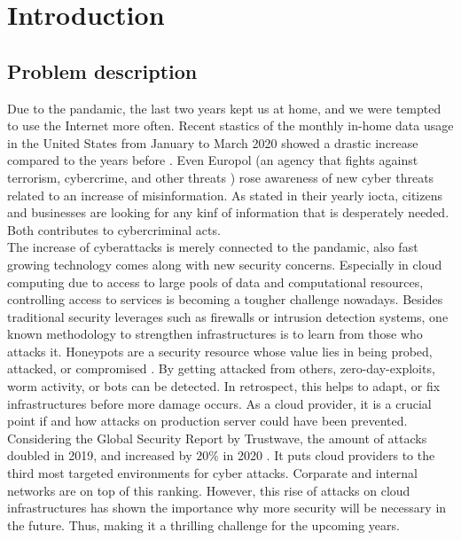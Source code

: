 \chapter{Introduction}


\section{Problem description}

Due to the pandamic, the last two years kept us at home, and we were tempted to use the Internet more often. Recent stastics of the monthly in-home data usage in the United States from January to March 2020 showed a drastic increase compared to the years before \cite{statista2021}. Even Europol (an agency that fights against terrorism, cybercrime, and other threats \cite{europol2021}) rose awareness of new cyber threats related to an increase of misinformation. As stated in their yearly \ac{iocta}, citizens and businesses are looking for any kinf of information that is desperately needed. Both contributes to cybercriminal acts. \cite{iocta2020}\\


The increase of cyberattacks is merely connected to the pandamic, also fast growing technology comes along with new security concerns. Especially in cloud computing due to access to large pools of data and computational resources, controlling access to services is becoming a tougher challenge nowadays. Besides traditional security leverages such as firewalls or intrusion detection systems, one known methodology to strengthen infrastructures is to learn from those who attacks it. Honeypots are a security resource whose value lies in being probed, attacked, or compromised \cite{Spitzner2003}. By getting attacked from others, zero-day-exploits, worm activity, or bots can be detected. In retrospect, this helps to adapt, or fix infrastructures before more damage occurs. As a cloud provider, it is a crucial point if and how attacks on production server could have been prevented. Considering the Global Security Report by Trustwave, the amount of attacks doubled in 2019, and increased by $20\%$ in 2020 \cite{fahim2020}. It puts cloud providers to the third most targeted environments for cyber attacks. Corparate and internal networks are on top of this ranking. However, this rise of attacks on cloud infrastructures has shown the importance why more security will be necessary in the future. Thus, making it a thrilling challenge for the upcoming years.\\

